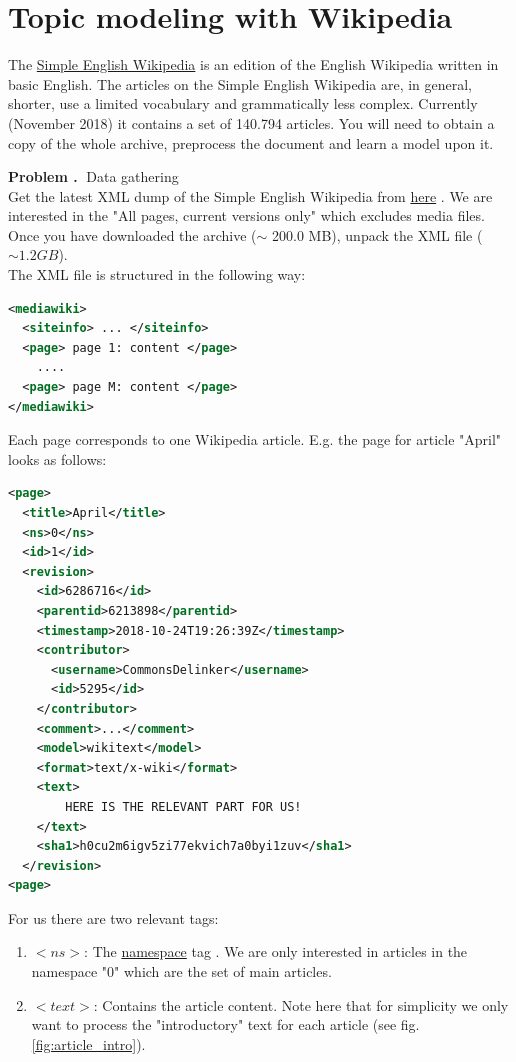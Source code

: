 \documentclass[10pt]{article}
\newcounter{problemCounter}
\newenvironment{problem}[1]
{
	\vspace{0.5cm}
	\refstepcounter{problemCounter}\label{#1}
	\noindent \textbf{Problem \theproblemCounter.$\;$} 
}{}
\begin{document}
\section{Topic modeling with Wikipedia}

The \href{https://simple.wikipedia.org/wiki/Main_Page}{Simple English Wikipedia} is an edition of the English Wikipedia written in basic English. The articles on the Simple English Wikipedia are, in general, shorter, use a limited vocabulary and grammatically less complex. Currently (November 2018) it contains a set of 140.794 articles. You will need to obtain a copy of the whole archive, preprocess the document and learn a model upon it.

\begin{problem}
	DData gathering \\
	Get the latest XML dump of the Simple English Wikipedia from  \href{https://dumps.wikimedia.org/simplewiki/20181120/}{here} \cite{url:sew-dump}. We are interested in the "All pages, current versions only" which excludes media files. Once you have downloaded the archive ($\sim$ 200.0 MB), unpack the XML file ($\sim 1.2 GB$).
\end{problem} \\
The XML file is structured in the following way:
\begin{lstlisting}[language=XML]
<mediawiki>
  <siteinfo> ... </siteinfo>
  <page> page 1: content </page>
    ....
  <page> page M: content </page>
</mediawiki>
\end{lstlisting}
Each page corresponds to one Wikipedia article. E.g. the page for article "April" looks as follows:
\begin{lstlisting}[language=XML]
<page>
  <title>April</title>
  <ns>0</ns>
  <id>1</id>
  <revision>
    <id>6286716</id>
    <parentid>6213898</parentid>
    <timestamp>2018-10-24T19:26:39Z</timestamp>
    <contributor>
      <username>CommonsDelinker</username>
      <id>5295</id>
    </contributor>
    <comment>...</comment>
    <model>wikitext</model>
    <format>text/x-wiki</format>
    <text>
        HERE IS THE RELEVANT PART FOR US!
    </text>
    <sha1>h0cu2m6igv5zi77ekvich7a0byi1zuv</sha1>
  </revision>
<page>
\end{lstlisting}
For us there are two relevant tags:
\begin{enumerate}
  \item $<ns>$: The \href{https://en.wikipedia.org/wiki/Wikipedia:Namespace}{namespace} tag \cite{url:wiki-ns}. We are only interested in articles in the namespace "$0$" which are the set of main articles.
  \item $<text>$: Contains the article content. Note here that for simplicity we only want to process the "introductory" text for each article (see fig. \ref{fig:article_intro}).
\end{enumerate}
\end{document}
